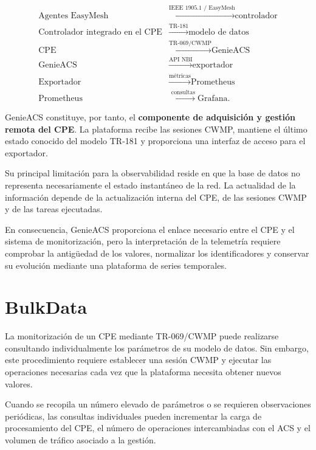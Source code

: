 \[
\begin{aligned}
    \text{Agentes EasyMesh}
    &\xrightarrow{\text{IEEE~1905.1 / EasyMesh}}
    \text{controlador}\\
    \text{Controlador integrado en el CPE}
    &\xrightarrow{\text{TR-181}}
    \text{modelo de datos}\\
    \text{CPE}
    &\xrightarrow{\text{TR-069/CWMP}}
    \text{GenieACS}\\
    \text{GenieACS}
    &\xrightarrow{\text{API NBI}}
    \text{exportador}\\
    \text{Exportador}
    &\xrightarrow{\text{métricas}}
    \text{Prometheus}\\
    \text{Prometheus}
    &\xrightarrow{\text{consultas}}
    \text{Grafana}.
\end{aligned}
\]

GenieACS constituye, por tanto, el
\textbf{componente de adquisición y gestión remota del CPE}. La
plataforma recibe las sesiones CWMP, mantiene el último estado conocido
del modelo TR-181 y proporciona una interfaz de acceso para el
exportador.

Su principal limitación para la observabilidad reside en que la base de
datos no representa necesariamente el estado instantáneo de la red. La
actualidad de la información depende de la actualización interna del CPE,
de las sesiones CWMP y de las tareas ejecutadas.

En consecuencia, GenieACS proporciona el enlace necesario entre el CPE y
el sistema de monitorización, pero la interpretación de la telemetría
requiere comprobar la antigüedad de los valores, normalizar los
identificadores y conservar su evolución mediante una plataforma de
series temporales.

\section{BulkData}
\label{sec:bulkdata}

La monitorización de un CPE mediante TR-069/CWMP puede realizarse
consultando individualmente los parámetros de su modelo de datos. Sin
embargo, este procedimiento requiere establecer una sesión CWMP y
ejecutar las operaciones necesarias cada vez que la plataforma necesita
obtener nuevos valores.

Cuando se recopila un número elevado de parámetros o se requieren
observaciones periódicas, las consultas individuales pueden incrementar
la carga de procesamiento del CPE, el número de operaciones intercambiadas
con el ACS y el volumen de tráfico asociado a la gestión.

